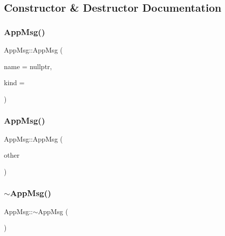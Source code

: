 \subsection{Constructor \& Destructor Documentation}
\mbox{\label{classAppMsg_abcde1b0a82cb815e59b04ba891f8d1a0}} 
\subsubsection{\texorpdfstring{App\+Msg()}{AppMsg()}\hspace{0.1cm}{\footnotesize\ttfamily [1/2]}}
{\footnotesize\ttfamily App\+Msg\+::\+App\+Msg (\begin{DoxyParamCaption}\item[{const char $\ast$}]{name = {\ttfamily nullptr},  }\item[{short}]{kind = {} }\end{DoxyParamCaption})}

\mbox{\label{classAppMsg_a1b1df77f37c0aba71d69dd65b963c5d5}} 
\subsubsection{\texorpdfstring{App\+Msg()}{AppMsg()}\hspace{0.1cm}{\footnotesize\ttfamily [2/2]}}
{\footnotesize\ttfamily App\+Msg\+::\+App\+Msg (\begin{DoxyParamCaption}\item[{const \hyperlink{classAppMsg}{App\+Msg} \&}]{other }\end{DoxyParamCaption})}

\mbox{\label{classAppMsg_ac15790acabb2755dd83d1d29f57e498c}} 
\subsubsection{\texorpdfstring{$\sim$\+App\+Msg()}{~AppMsg()}}
{\footnotesize\ttfamily App\+Msg\+::$\sim$\+App\+Msg (\begin{DoxyParamCaption}{ }\end{DoxyParamCaption})\hspace{0.3cm}{\ttfamily [virtual]}}



